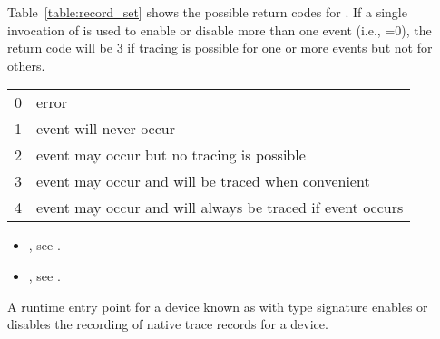 \effect

Table~\ref{table:record_set} shows the possible return
codes for .  If a single invocation
of  is used to enable or disable
more than one event (i.e., =0), the return code will
be 3 if tracing is possible for one or more events but not for
others.

\nolinenumbers
\renewcommand{\arraystretch}{1.5}
\tablelasttail{\hline}
\begin{supertabular}{p{2.0in} p{3.0in}}
0 & error\\
1 & event will never occur\\
2 & event may occur but no tracing is possible\\
3 & event may occur and will be traced when convenient\\
4 & event may occur and will always be traced if event occurs\\
\end{supertabular}

\linenumbers

\crossreferences
\begin{itemize}
\item {},
see .
\item {},
see .
\end{itemize}

\label{sec:ompt_set_trace_native_t}

\summary
A runtime entry point for a device known as 
with type signature 
enables or disables the recording of native trace records for a device.


